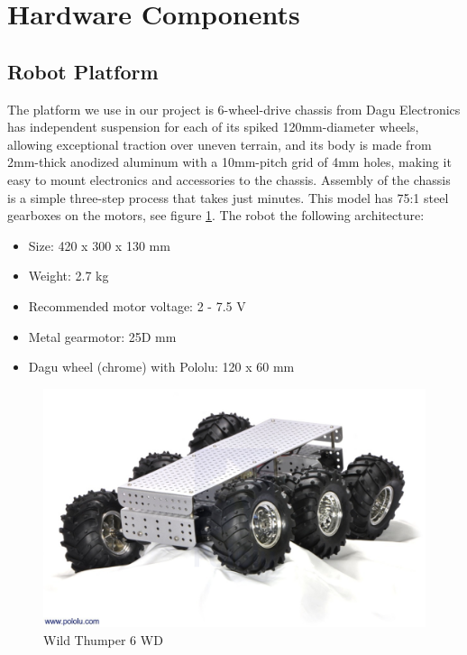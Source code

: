 
\section{Hardware Components}
\subsection{Robot Platform}
\hspace{2cm}The platform we use in our project is 6-wheel-drive chassis from Dagu Electronics has independent suspension for each of its spiked 120mm-diameter wheels, allowing exceptional traction over uneven terrain, and its body is made from 2mm-thick anodized aluminum with a 10mm-pitch grid of 4mm holes, making it easy to mount electronics and accessories to the chassis. Assembly of the chassis is a simple three-step process that takes just minutes. This model has 75:1 steel gearboxes on the motors, see figure \ref{fig:wild thumper}. The robot the following architecture: \cite{web012}
 \begin{itemize}
        \item Size: 420 x 300 x 130 mm
        \item Weight: 2.7 kg
        \item Recommended motor voltage: 2 - 7.5 V
        \item Metal gearmotor: 25D mm
        \item Dagu wheel (chrome) with Pololu: 120 x 60 mm
    \end{itemize}{}

 \begin{figure}[H]%
    \center%
    \includegraphics[width=.8\textwidth]
    {images/Alzahraa/wild_thumper.jpg}%
    \caption[Wild Thumper]{Wild Thumper 6 WD}\label{fig:wild thumper}%
  \end{figure} 

